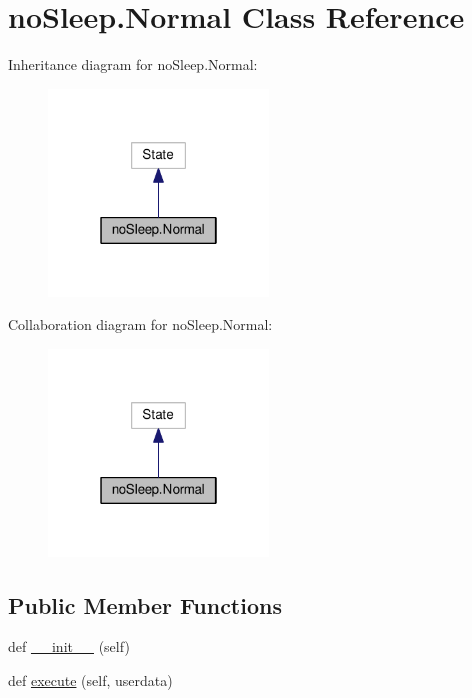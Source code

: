 \hypertarget{classnoSleep_1_1Normal}{}\section{no\+Sleep.\+Normal Class Reference}
\label{classnoSleep_1_1Normal}


Inheritance diagram for no\+Sleep.\+Normal\+:
\nopagebreak
\begin{figure}[H]
\begin{center}
\leavevmode
\includegraphics[width=166pt]{classnoSleep_1_1Normal__inherit__graph}
\end{center}
\end{figure}


Collaboration diagram for no\+Sleep.\+Normal\+:
\nopagebreak
\begin{figure}[H]
\begin{center}
\leavevmode
\includegraphics[width=166pt]{classnoSleep_1_1Normal__coll__graph}
\end{center}
\end{figure}
\subsection*{Public Member Functions}
\begin{DoxyCompactItemize}
\item 
def \hyperlink{classnoSleep_1_1Normal_a408dace152fbaea3a755a27ded06b1a5}{\+\_\+\+\_\+init\+\_\+\+\_\+} (self)
\item 
def \hyperlink{classnoSleep_1_1Normal_ad4ca86ae46f2a71c2e8fc58efeb6e152}{execute} (self, userdata)
\end{DoxyCompactItemize}
